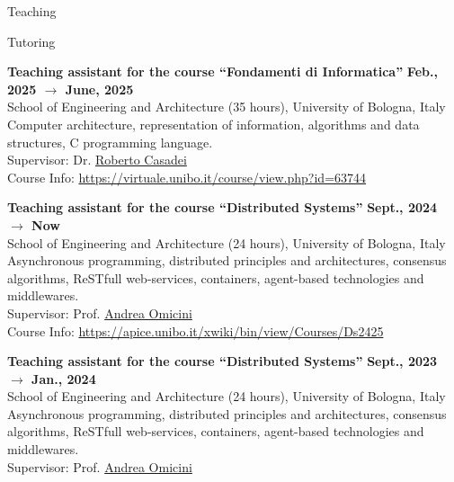 \documentclass{resume} %
\begin{document}
    \begin{rSection}{Teaching}


        \begin{rSubsection2}{Tutoring}
            \item\textbf{ Teaching assistant for the course ``Fondamenti di Informatica'' }\hfill \textbf{Feb., 2025 $\rightarrow$ June, 2025}
            \\School of Engineering and Architecture (35 hours), University of Bologna, Italy
            \\Computer architecture, representation of information, algorithms and data structures, C programming language.
            \\Supervisor: Dr. \href{mailto:roberto.casadei@unibo.it}{Roberto Casadei}
            \\Course Info: \url{https://virtuale.unibo.it/course/view.php?id=63744}
            \item\textbf{Teaching assistant for the course ``Distributed Systems'' }\hfill \textbf{Sept., 2024 $\rightarrow$ Now}
            \\School of Engineering and Architecture (24 hours), University of Bologna, Italy
            \\Asynchronous programming, distributed principles and architectures, consensus algorithms, ReSTfull web-services, containers, agent-based technologies and middlewares.
            \\Supervisor: Prof. \href{mailto:andrea.omicini@unibo.it}{Andrea Omicini}
            \\Course Info: \url{https://apice.unibo.it/xwiki/bin/view/Courses/Ds2425}
            \item\textbf{ Teaching assistant for the course ``Distributed Systems'' }\hfill \textbf{Sept., 2023 $\rightarrow$ Jan., 2024}
            \\School of Engineering and Architecture (24 hours), University of Bologna, Italy
            \\Asynchronous programming, distributed principles and architectures, consensus algorithms, ReSTfull web-services, containers, agent-based technologies and middlewares.
            \\Supervisor: Prof. \href{mailto:andrea.omicini@unibo.it}{Andrea Omicini}

\end{rSubsection2}
\end{rSection}
\end{document}
